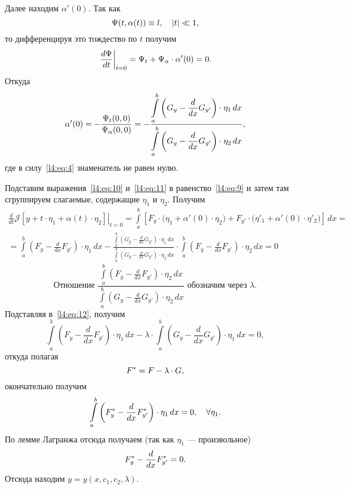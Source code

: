 \documentclass[12pt,a4paper,openany,fleqn]{book}
\newcommand{\J}{\ensuremath{\mathcal{J}}}
\newcommand{\der}[2]{\ensuremath{\frac{d#1}{d#2}}}
\theoremstyle{definition}
\begin{document}
Далее находим $\alpha'(0)$. Так как 
\begin{equation*}
	\hfill\Psi(t,\alpha(t))\equiv l,\quad|t|\ll1,\hfill
\end{equation*}
то дифференцируя это тождество по $t$ получим
\begin{equation*}
	\hfill\left.\der{\Psi}{t}\right|_{t=0}=\Psi_t+\Psi_{\alpha}\cdot\alpha'(0)=0.\hfill
\end{equation*}
Откуда
\begin{equation}
	\label{l4:eq:11}
	\hfill\alpha'(0)=-\frac{\Psi_t(0,0)}{\Psi_{\alpha}(0,0)}=-\frac{\displaystyle\int\limits_a^b\left(G_y-\der{}{x}G_{y'}\right)\cdot\eta_1\,dx}{\displaystyle\int\limits_a^b\left(G_y-\der{}{x}G_{y'}\right)\cdot\eta_2\,dx},\hfill
\end{equation}
где в силу~\eqref{l4:eq:4} знаменатель не равен нулю.

Подставим выражения~\eqref{l4:eq:10} и~\eqref{l4:eq:11} в равенство~\eqref{l4:eq:9} и затем там сгруппируем слагаемые, содержащие $\eta_1$ и $\eta_2$. Получим
\begin{multline}
	\label{l4:eq:12}
	\left.\der{}{t}\J[y+t\cdot\eta_1+\alpha(t)\cdot\eta_2]\right|_{t=0}=\int\limits_a^b\left[F_y\cdot\big(\eta_1+\alpha'(0)\cdot\eta_2\big)+F_{y'}\cdot\big(\eta'_1+\alpha'(0)\cdot\eta'_2\big)\right]\,dx=\\
	=\int\limits_a^b\left(F_y-\der{}{x}F_{y'}\right)\cdot\eta_1\,dx-\frac{\displaystyle\int\limits_a^b\left(G_y-\der{}{x}G_{y'}\right)\cdot\eta_1\,dx}{\displaystyle\int\limits_a^b\left(G_y-\der{}{x}G_{y'}\right)\cdot\eta_2\,dx}\cdot\int\limits_a^b\left(F_y-\der{}{x}F_{y'}\right)\cdot\eta_2\,dx=0
\end{multline}  
\begin{equation*}
	\text{Отношение }\frac{\displaystyle\int\limits_a^b\left(F_y-\der{}{x}F_{y'}\right)\cdot\eta_2\,dx}{\displaystyle\int\limits_a^b\left(G_y-\der{}{x}G_{y'}\right)\cdot\eta_2\,dx}\text{ обозначим через }\lambda.
\end{equation*}
Подставляя в~\eqref{l4:eq:12}, получим
\begin{equation*}
	\int\limits_a^b\left(F_y-\der{}{x}F_{y'}\right)\cdot\eta_1\,dx-\lambda\cdot\int\limits_a^b\left(G_y-\der{}{x}G_{y'}\right)\cdot\eta_1\,dx=0,
\end{equation*} 
откуда полагая
\begin{equation*}
	\hfill F^{\ast}=F-\lambda\cdot G,\hfill
\end{equation*}
окончательно получим
\begin{equation}
	\label{l4:eq:13}
	\hfill\int\limits_a^b\left(F^{\ast}_y-\der{}{x}F^{\ast}_{y'}\right)\cdot\eta_1\,dx=0,\quad\forall\eta_1.\hfill
\end{equation} 
По лемме Лагранжа отсюда получаем (так как $\eta_1$ --- произвольное)
\begin{equation}
	\label{l4:eq:14}
	\hfill F^{\ast}_y-\der{}{x}F^{\ast}_{y'}=0.\hfill
\end{equation}
Отсюда находим $y=y(x,c_1,c_2,\lambda)$. 
\end{document}
